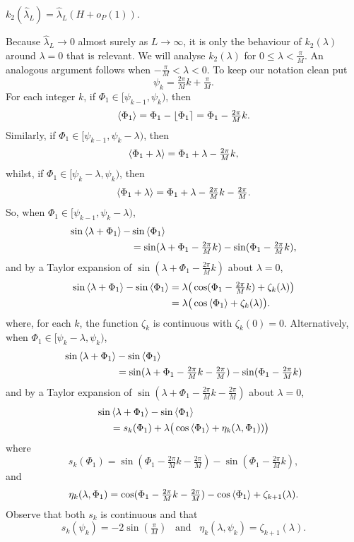 \documentclass[journal]{IEEEtran}
\begin{document}
\begin{lemma}\label{lem:k2conv}
$k_2(\hat{\lambda}_L) = \hat{\lambda}_L ( H + o_P(1) ).$
\end{lemma}
\begin{IEEEproof}
Because $\hat{\lambda}_L \rightarrow 0$ almost surely as $L\rightarrow\infty$, it is only the behaviour of $k_2(\lambda)$ around $\lambda = 0$ that is relevant.  We will analyse $k_2(\lambda)$ for $0 \leq \lambda < \tfrac{\pi}{M}$.  An analogous argument follows when $-\tfrac{\pi}{M} < \lambda < 0$.  To keep our notation clean put
\[
\psi_k = \tfrac{2\pi}{M}k + \tfrac{\pi}{M}.
\]
For each integer $k$, if $\Phi_1 \in [\psi_{k-1}, \psi_k)$, then
\[
\left\langle \Phi_1 \right\rangle = \Phi_1 - {\left\lfloor \Phi_1 \right\rceil} = \Phi_1 - \tfrac{2\pi}{M}k.
\]
Similarly, if $\Phi_1 \in  [\psi_{k-1}, \psi_{k} - \lambda)$, then
\[
\left\langle \Phi_1 + \lambda \right\rangle = \Phi_1 + \lambda - \tfrac{2\pi}{M}k,
\]
whilst, if $\Phi_1 \in [\psi_{k} - \lambda, \psi_{k})$, then
\[
\left\langle \Phi_1 + \lambda \right\rangle = \Phi_1 + \lambda - \tfrac{2\pi}{M}k - \tfrac{2\pi}{M}.
\]
So, when $\Phi_1 \in [\psi_{k-1}, \psi_{k} - \lambda )$,
\begin{align*}
\sin\left\langle \lambda + \Phi_1 \right\rangle - &\sin\left\langle \Phi_1 \right\rangle \\
&= \sin(\lambda + \Phi_1 - \tfrac{2\pi}{M}k) - \sin(\Phi_1 - \tfrac{2\pi}{M}k),
\end{align*}
and by a Taylor expansion of $\sin(\lambda + \Phi_1 - \tfrac{2\pi}{M}k)$ about $\lambda = 0$, 
\begin{align*}
\sin\left\langle \lambda + \Phi_1 \right\rangle - \sin\left\langle \Phi_1 \right\rangle &= \lambda\big(\cos(\Phi_1 - \tfrac{2\pi}{M}k) + \zeta_k(\lambda)\big) \\
&= \lambda\big(\cos\left\langle \Phi_1 \right\rangle + \zeta_k(\lambda)\big).
\end{align*}
where, for each $k$, the function $\zeta_k$ is continuous with $\zeta_k(0) = 0$.  Alternatively, when $\Phi_1 \in [ \psi_{k} - \lambda,\psi_{k})$,
\begin{align*}
\sin\left\langle \lambda + \Phi_1 \right\rangle &- \sin\left\langle \Phi_1 \right\rangle \\
&= \sin(\lambda + \Phi_1 - \tfrac{2\pi}{M}k - \tfrac{2\pi}{M}) - \sin(\Phi_1 - \tfrac{2\pi}{M}k)
\end{align*}
and by a Taylor expansion of $\sin(\lambda + \Phi_1 - \tfrac{2\pi}{M}k - \tfrac{2\pi}{M})$ about $\lambda = 0$,
\begin{align*}
\sin&\left\langle \lambda + \Phi_1 \right\rangle - \sin\left\langle \Phi_1 \right\rangle \\
&= s_k(\Phi_1) + \lambda\big(\cos\left\langle \Phi_1 \right\rangle + \eta_k(\lambda, \Phi_1)  )\big)
\end{align*}
where
\[
s_k(\Phi_1) = \sin(\Phi_1 - \tfrac{2\pi}{M}k - \tfrac{2\pi}{M}) - \sin(\Phi_1 - \tfrac{2\pi}{M}k),
\]
and
\[
\eta_k(\lambda, \Phi_1) = \cos(\Phi_1 - \tfrac{2\pi}{M}k - \tfrac{2\pi}{M}) - \cos\left\langle \Phi_1 \right\rangle + \zeta_{k+1}(\lambda).
\]
Observe that both $s_k$ is continuous and that 
\[
s_k(\psi_{k}) = -2\sin(\tfrac{\pi}{M}) \;\;\; \text{and} \;\;\; \eta_k(\lambda,\psi_k) = \zeta_{k+1}(\lambda).
\]


\end{IEEEproof}
\end{document}
